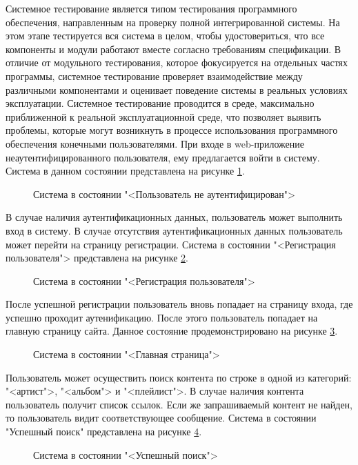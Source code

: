 Системное тестирование является типом тестирования программного обеспечения, направленным на проверку полной интегрированной системы. На этом этапе тестируется вся система в целом, чтобы удостовериться, что все компоненты и модули работают вместе согласно требованиям спецификации. В отличие от модульного тестирования, которое фокусируется на отдельных частях программы, системное тестирование проверяет взаимодействие между различными компонентами и оценивает поведение системы в реальных условиях эксплуатации.
Системное тестирование проводится в среде, максимально приближенной к реальной эксплуатационной среде, что позволяет выявить проблемы, которые могут возникнуть в процессе использования программного обеспечения конечными пользователями.
При входе в web-приложение неаутентифицированного пользователя, ему предлагается войти в систему. Система в данном состоянии представлена на рисунке \ref{stestLoginEmpty:image}.
\begin{figure}[H]
\caption{Система в состоянии "<Пользователь не аутентифицирован">}
\label{stestLoginEmpty:image}
\end{figure}
В случае наличия аутентификационных данных, пользователь может выполнить вход в систему. В случае отсутствия аутентификационных данных пользователь может перейти на страницу регистрации. Система в состоянии "<Регистрация пользователя"> представлена на рисунке \ref{stestReg:image}.
\begin{figure}[H]
	\caption{Система в состоянии "<Регистрация пользователя">}
	\label{stestReg:image}
\end{figure}
После успешной регистрации пользователь вновь попадает на страницу входа, где успешно проходит аутенификацию. После этого пользователь попадает на главную страницу сайта. Данное состояние продемонстрировано на рисунке \ref{stestHome:image}.
\begin{figure}[!htb]
	\caption{Система в состоянии "<Главная страница">}
	\label{stestHome:image}
\end{figure}
Пользователь может осуществить поиск контента по строке в одной из категорий: "<артист">, "<альбом"> и "<плейлист">. В случае наличия контента пользователь получит список ссылок. Если же запрашиваемый контент не найден, то пользователь видит соответствующее сообщение. Система в состоянии "Успешный поиск" представлена на рисунке \ref{stestSearchSuc:image}.
\begin{figure}[H]
	\caption{Система в состоянии "<Успешный поиск">}
	\label{stestSearchSuc:image}
\end{figure}
